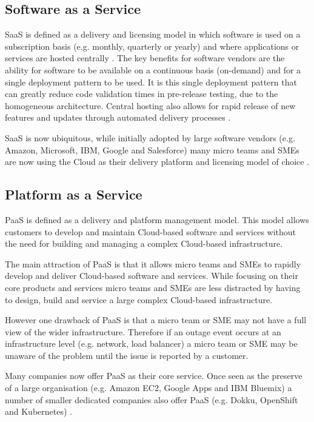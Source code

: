 \documentclass[5p]{elsarticle}
\begin{document}
\subsection{Software as a Service}
SaaS is defined as a delivery and licensing model in which software is used on a subscription basis (e.g. monthly, quarterly or yearly) and where applications or services are hosted centrally \cite{Cloudbook2015}. The key benefits for software vendors are the ability for software to be available on a continuous basis (on-demand) and for a single deployment pattern to be used. It is this single deployment pattern that can greatly reduce code validation times in pre-release testing, due to the homogeneous architecture. Central hosting also allows for rapid release of new features and updates through automated delivery processes \cite{datacentre2015}. 

SaaS is now ubiquitous, while initially adopted by large software vendors (e.g. Amazon, Microsoft, IBM, Google and Salesforce) many micro teams and SMEs are now using the Cloud as their delivery platform and licensing model of choice \cite{CRN2015providers}. 

\subsection{Platform as a Service}
PaaS is defined as a delivery and platform management model. This model allows customers to develop and maintain Cloud-based software and services without the need for building and managing a complex Cloud-based infrastructure.

The main attraction of PaaS is that it allows micro teams and SMEs to rapidly develop and deliver Cloud-based software and services. While focusing on their core products and services micro teams and SMEs are less distracted by having to design, build and service a large complex Cloud-based infrastructure. 

However one drawback of PaaS is that a micro team or SME may not have a full view of the wider infrastructure. Therefore if an outage event occurs at an infrastructure level (e.g. network, load balancer) a micro team or SME may be unaware of the problem until the issue is reported by a customer.

Many companies now offer PaaS as their core service. Once seen as the preserve of a large organisation (e.g. Amazon EC2, Google Apps and IBM Bluemix) a number of smaller dedicated companies also offer PaaS (e.g. Dokku, OpenShift and Kubernetes) \cite{Paas2016}.
\end{document}
